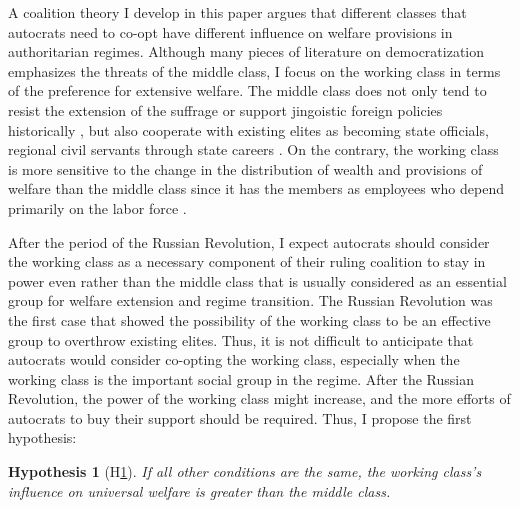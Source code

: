 \documentclass[11pt]{article}
\newtheorem{hyp}{Hypothesis}
\begin{document}
A coalition theory I develop in this paper argues that different classes that autocrats need to co-opt have different influence on welfare provisions in authoritarian regimes. Although many pieces of literature on democratization emphasizes the threats of the middle class, I focus on the working class in terms of the preference for extensive welfare. The middle class does not only tend to resist the extension of the suffrage or support jingoistic foreign policies historically \citep{Lipset1959}, but also cooperate with existing elites as becoming state officials, regional civil servants through state careers \citep{Rosenfeld2017}. On the contrary, the working class is more sensitive to the change in the distribution of wealth and provisions of welfare than the middle class since it has the members as employees who depend primarily on the labor force \citep{Korpi2006}.

After the period of the Russian Revolution, I expect autocrats should consider the working class as a necessary component of their ruling coalition to stay in power even rather than the middle class that is usually considered as an essential group for welfare extension and regime transition. The Russian Revolution was the first case that showed the possibility of the working class to be an effective group to overthrow existing elites. Thus, it is not difficult to anticipate that autocrats would consider co-opting the working class, especially when the working class is the important social group in the regime. After the Russian Revolution, the power of the working class might increase, and the more efforts of autocrats to buy their support should be required. Thus, I propose the first hypothesis:\par

\begin{hyp}[H\ref{hyp:first}] \label{hyp:first}
	If all other conditions are the same, the working class's influence on universal welfare is greater than the middle class.
\end{hyp}
\end{document}
